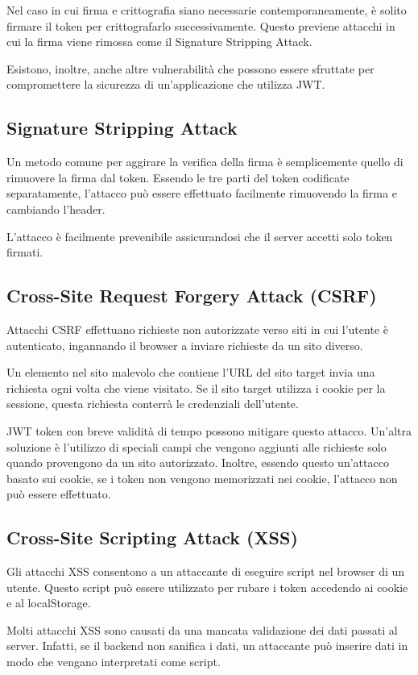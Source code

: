 \documentclass{article}
\begin{document}
Nel caso in cui firma e crittografia siano necessarie contemporaneamente, è solito firmare il token per crittografarlo successivamente.
Questo previene attacchi in cui la firma viene rimossa come il Signature Stripping Attack.

Esistono, inoltre, anche altre vulnerabilità che possono essere sfruttate per compromettere la sicurezza di un'applicazione che utilizza JWT.

\subsection{Signature Stripping Attack}
Un metodo comune per aggirare la verifica della firma è semplicemente quello di rimuovere la firma dal token.
Essendo le tre parti del token codificate separatamente, l'attacco può essere effettuato facilmente rimuovendo la firma e cambiando l'header.

L'attacco è facilmente prevenibile assicurandosi che il server accetti solo token firmati.

\subsection{Cross-Site Request Forgery Attack (CSRF)}
Attacchi CSRF effettuano richieste non autorizzate verso siti in cui l'utente è autenticato, ingannando il browser a inviare richieste da un sito diverso.

Un elemento nel sito malevolo che contiene l'URL del sito target invia una richiesta ogni volta che viene visitato.
Se il sito target utilizza i cookie per la sessione, questa richiesta conterrà le credenziali dell'utente.

JWT token con breve validità di tempo possono mitigare questo attacco.
Un'altra soluzione è l'utilizzo di speciali campi che vengono aggiunti alle richieste solo quando provengono da un sito autorizzato.
Inoltre, essendo questo un'attacco basato sui cookie, se i token non vengono memorizzati nei cookie, l'attacco non può essere effettuato.

\subsection{Cross-Site Scripting Attack (XSS)}
Gli attacchi XSS consentono a un attaccante di eseguire script nel browser di un utente.
Questo script può essere utilizzato per rubare i token accedendo ai cookie e al localStorage.

Molti attacchi XSS sono causati da una mancata validazione dei dati passati al server.
Infatti, se il backend non sanifica i dati, un attaccante può inserire dati in modo che vengano interpretati come script.
\end{document}
